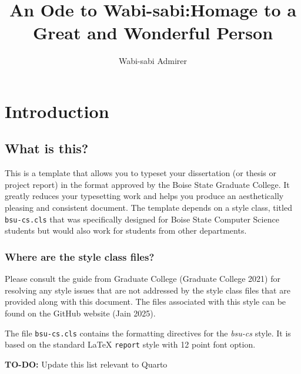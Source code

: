 \documentclass[
  dissertation]{bsu-cs}
\title{An Ode to Wabi-sabi:\titleBreak Homage to a Great and Wonderful
Person}
\author{Wabi-sabi Admirer}
\begin{document}
\frontmatter

\buildFrontPages










\mainmatter

\chapter{Introduction} \label{ch-intro}

\section{What is this?}\label{what-is-this}

This is a template that allows you to typeset your dissertation (or
thesis or project report) in the format approved by the Boise State
Graduate College. It greatly reduces your typesetting work and helps you
produce an aesthetically pleasing and consistent document. The template
depends on a style class, titled \texttt{bsu-cs.cls} that was
specifically designed for Boise State Computer Science students but
would also work for students from other departments.

\subsection{Where are the style class
files?}\label{where-are-the-style-class-files}

Please consult the guide from Graduate College (Graduate College 2021)
for resolving any style issues that are not addressed by the style class
files that are provided along with this document. The files associated
with this style can be found on the GitHub website (Jain 2025).

The file \texttt{bsu-cs.cls} contains the formatting directives for the
\emph{bsu-cs} style. It is based on the standard LaTeX \texttt{report}
style with 12 point font option.

\textbf{TO-DO:} Update this list relevant to Quarto
\end{document}
